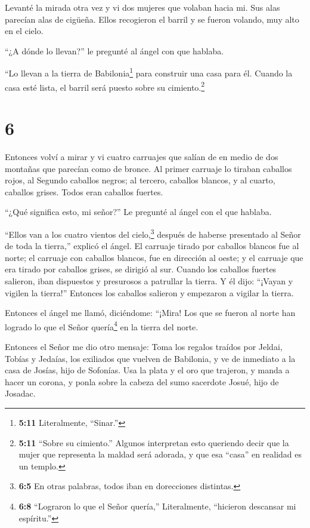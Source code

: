  Levanté la mirada otra vez y vi dos mujeres que volaban
hacia mi. Sus alas parecían alas de cigüeña. Ellos recogieron el barril
y se fueron volando, muy alto en el cielo.

 ``¿A dónde lo llevan?'' le pregunté al ángel con que
hablaba.

 ``Lo llevan a la tierra de Babilonia\footnote{\textbf{5:11}
  Literalmente, ``Sinar.''} para construir una casa para él. Cuando la
casa esté lista, el barril será puesto sobre su cimiento.\footnote{\textbf{5:11}
  ``Sobre su cimiento.'' Algunos interpretan esto queriendo decir que la
  mujer que representa la maldad será adorada, y que esa ``casa'' en
  realidad es un templo.}

\hypertarget{section-5}{%
\section{6}\label{section-5}}

 Entonces volví a mirar y vi cuatro carruajes que salían de
en medio de dos montañas que parecían como de bronce.  Al
primer carruaje lo tiraban caballos rojos, al Segundo caballos negros;
 al tercero, caballos blancos, y al cuarto, caballos grises.
Todos eran caballos fuertes.

 ``¿Qué significa esto, mi señor?'' Le pregunté al ángel con
el que hablaba.

 ``Ellos van a los cuatro vientos del cielo,\footnote{\textbf{6:5}
  En otras palabras, todos iban en dorecciones distintas.} después de
haberse presentado al Señor de toda la tierra,'' explicó el ángel.
 El carruaje tirado por caballos blancos fue al norte; el
carruaje con caballos blancos, fue en dirección al oeste; y el carruaje
que era tirado por caballos grises, se dirigió al sur. 
Cuando los caballos fuertes salieron, iban dispuestos y presurosos a
patrullar la tierra. Y él dijo: ``¡Vayan y vigilen la tierra!'' Entonces
los caballos salieron y empezaron a vigilar la tierra.

 Entonces el ángel me llamó, diciéndome: ``¡Mira! Los que se
fueron al norte han logrado lo que el Señor quería\footnote{\textbf{6:8}
  ``Lograron lo que el Señor quería,'' Literalmente, ``hicieron
  descansar mi espíritu.''} en la tierra del norte.

 Entonces el Señor me dio otro mensaje:  Toma
los regalos traídos por Jeldai, Tobías y Jedaías, los exiliados que
vuelven de Babilonia, y ve de inmediato a la casa de Josías, hijo de
Sofonías.  Usa la plata y el oro que trajeron, y manda a
hacer un corona, y ponla sobre la cabeza del sumo sacerdote Josué, hijo
de Josadac.

